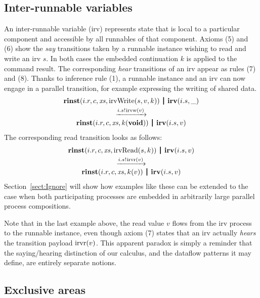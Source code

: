\documentclass[twocolumn]{article}
\begin{document}
\subsection{Inter-runnable variables}

An inter-runnable variable (irv) represents state that is local to a particular component and accessible by all runnables of that component. Axioms (5) and (6) show the \emph{say} transitions taken by a runnable instance wishing to read and write an irv $s$. In both cases the embedded continuation $k$ is applied to the command result. The corresponding \emph{hear} transitions of an irv appear as rules (7) and (8). Thanks to inference rule (1), a runnable instance and an irv can now engage in a parallel transition, for example expressing the writing of shared data.
$$
\begin{array}{c}
	\Tpar {\Trinst {i.r} c \Xs {\TrteIrvWrite s v k}}
	 	  {\Tirv {i.s} \_} \vspace{0.6ex} \\ 
	\red {\say {i.s} {\Tirvw v}} \\
	\Tpar {\Trinst {i.r} c \Xs {\Tap k \Tvoid}}
		  {\Tirv {i.s} v}
\end{array}
$$
The corresponding read transition looks as follows:
$$
\begin{array}{c}
	\Tpar {\Trinst {i.r} c \Xs {\TrteIrvRead s k}}
	 	  {\Tirv {i.s} v} \vspace{0.6ex} \\ 
	\red{\say {i.s} {\Tirvr v}} \\
	\Tpar{\Trinst {i.r} c \Xs {\Tap k v}}
		 {\Tirv {i.s} v}
\end{array}
$$
Section~\ref{sect:Ignore} will show how examples like these can be extended to the case when both participating processes are embedded in arbitrarily large parallel process compositions.

Note that in the last example above, the read value $v$ flows from the irv process to the runnable instance, even though axiom (7) states that an irv actually \emph{hears} the transition payload $\mathrm{irvr}(v)$. This apparent paradox is simply a reminder that the saying/hearing distinction of our calculus, and the dataflow patterns it may define, are entirely separate notions.


\subsection{Exclusive areas}
\end{document}
